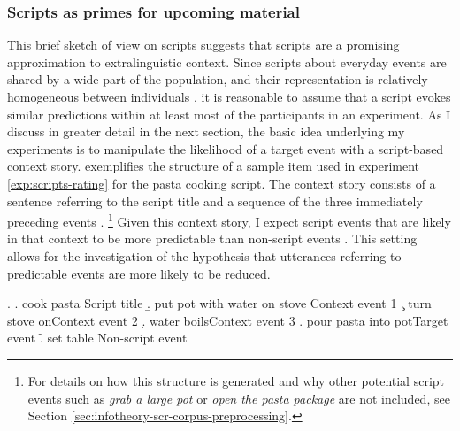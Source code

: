 \subsubsection{Scripts as primes for upcoming material}
This brief sketch of  view on scripts suggests that scripts are a promising approximation to extralinguistic context. Since scripts about everyday events are shared by a wide part of the population, and their representation is relatively homogeneous between individuals \citep{bower.etal1979}, it is reasonable to assume that a script evokes similar predictions within at least most of the participants in an experiment. As I discuss in greater detail in the next section, the basic idea underlying my experiments is to manipulate the likelihood of a target event with a script-based context story. \Next exemplifies the structure of a sample item used in experiment \ref{exp:scripts-rating} for the pasta cooking script. The context story consists of a  sentence referring to the script title \Next[a] and a sequence of the three immediately preceding events \Next[b-d].%
%
\footnote{For details on how this structure is generated and why other potential script events such as \textit{grab a large pot} or \textit{open the pasta package} are not included, see Section \ref{sec:infotheory-scr-corpus-preprocessing}.}\afterfn%
%
Given this context story, I expect script events \Next[e] that are likely in that context to be more predictable than non-script events \Next[f]. This setting allows for the investigation of the hypothesis that utterances referring to predictable events are more likely to be reduced.

\ex.  \label{ex:scripts-item-abstract}
\a. cook pasta \hfill Script title
    \b. put pot with water on stove \hfill Context event 1
    \c. turn stove on\hfill Context event 2
    \d. water boils\hfill Context event 3
    \e. pour pasta into pot\hfill Target event
    \f. set table \hfill Non-script event

